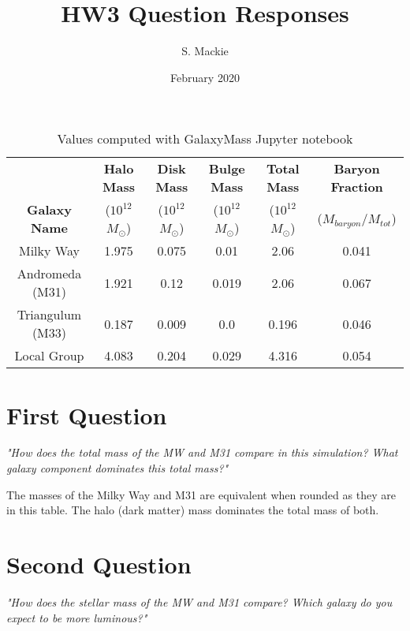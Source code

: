 \documentclass{article}
\title{HW3 Question Responses}
\author{S. Mackie}
\date{February 2020}
\begin{document}
\maketitle

\begin{table}[h]
    \begin{adjustwidth}{-1.5in}{-1.5in}
        \centering
        \begin{center}
        \begin{tabular}{|c|c|c|c|c|c|}
            \hline
             & \textbf{Halo Mass} & \textbf{Disk Mass} & \textbf{Bulge Mass} & \textbf{Total Mass} & \textbf{Baryon Fraction}\\
            \textbf{Galaxy Name} & ($10^{12}$\( M_\odot\)) & ($10^{12}$\( M_\odot\)) & ($10^{12}$\( M_\odot\)) & ($10^{12}$\( M_\odot\)) & (\(M_{baryon}/ M_{tot}\)) \\
            \hline
            \hline
            Milky Way & 1.975 & 0.075 & 0.01 & 2.06 & 0.041\\
            \hline
            Andromeda (M31) & 1.921 & 0.12 & 0.019 & 2.06 & 0.067\\
            \hline
            Triangulum (M33) & 0.187 & 0.009 & 0.0 & 0.196 & 0.046\\
            \hline
            Local Group & 4.083 & 0.204 & 0.029 & 4.316 & 0.054\\
            \hline
        \end{tabular}
        \end{center}
        \caption{Values computed with GalaxyMass Jupyter notebook}
    \end{adjustwidth}
\end{table}

\section{First Question}
\textit{"How does the total mass of the MW and M31 compare in this simulation? What galaxy
component dominates this total mass?"}

The masses of the Milky Way and M31 are equivalent when rounded as they are in this table. The halo (dark matter) mass dominates the total mass of both.

\section{Second Question}
\textit{"How does the stellar mass of the MW and M31 compare? Which galaxy do you expect to be more luminous?"}
\end{document}
